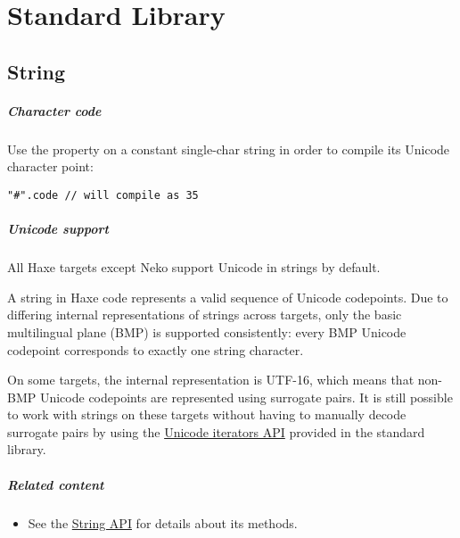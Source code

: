 \chapter{Standard Library}
\label{std}

\section{String}
\label{std-String}


\paragraph{Character code}
Use the  property on a constant single-char string in order to compile its Unicode character point:

\begin{lstlisting}
"#".code // will compile as 35
\end{lstlisting}


\paragraph{Unicode support}
All Haxe targets except Neko support Unicode in strings by default.

A string in Haxe code represents a valid sequence of Unicode codepoints. Due to differing internal representations of strings across targets, only the basic multilingual plane (BMP) is supported consistently: every BMP Unicode codepoint corresponds to exactly one string character.

On some targets, the internal representation is UTF-16, which means that non-BMP Unicode codepoints are represented using surrogate pairs. It is still possible to work with strings on these targets without having to manually decode surrogate pairs by using the \href{https://api.haxe.org/v/development/haxe/iterators/StringIteratorUnicode.html}{Unicode iterators API} provided in the standard library.

\paragraph{Related content}
\begin{itemize}
	\item See the \href{https://api.haxe.org/String.html}{String API} for details about its methods.
\end{itemize} 

